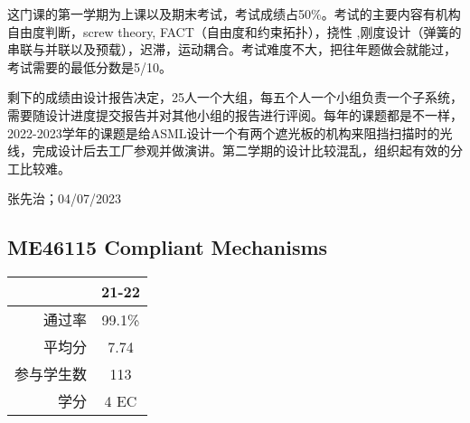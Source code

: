 这门课的第一学期为上课以及期末考试，考试成绩占50\%。考试的主要内容有机构自由度判断，screw theory, FACT（自由度和约束拓扑），挠性 ,刚度设计（弹簧的串联与并联以及预载），迟滞，运动耦合。考试难度不大，把往年题做会就能过，考试需要的最低分数是5/10。

剩下的成绩由设计报告决定，25人一个大组，每五个人一个小组负责一个子系统，需要随设计进度提交报告并对其他小组的报告进行评阅。每年的课题都是不一样，2022-2023学年的课题是给ASML设计一个有两个遮光板的机构来阻挡扫描时的光线，完成设计后去工厂参观并做演讲。第二学期的设计比较混乱，组织起有效的分工比较难。
\begin{flushright}
张先治；04/07/2023
\end{flushright}

\subsection{ME46115 Compliant Mechanisms}\hypertarget{ME46115}{} 
\begin{minipage}{0.45\textwidth}
\centering
{}
\end{minipage}%
\begin{minipage}{0.45\textwidth}
\raggedleft
\begin{tabular}{r|c}
\textbf{ } & \textbf{21-22} \\ \hline
通过率 & 99.1\%\\ 
平均分 & 7.74 \\ 
参与学生数 & 113 \\ 
学分 & 4 EC\\
\end{tabular}
\end{minipage}\\

